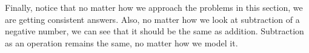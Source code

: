 \documentclass{ximera}
\begin{document}
Finally, notice that no matter how we approach the problems in this section, we are getting 
consistent answers.  Also, no matter how we look at subtraction of a negative number, we can 
see that it should be the same as addition.  Subtraction as an operation remains the same, 
no matter how we model it.  
\end{document}

